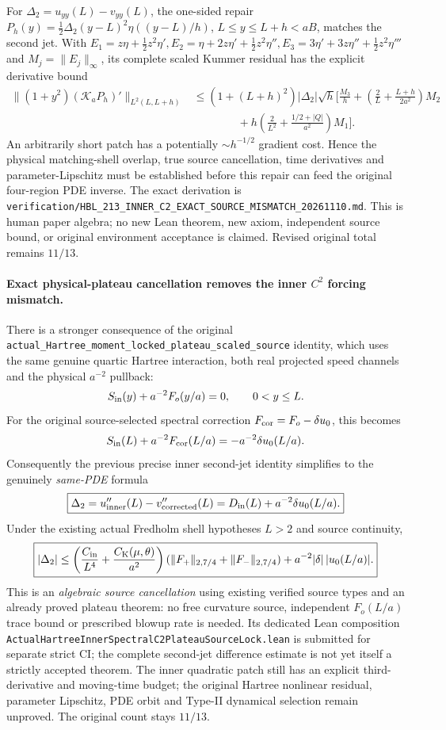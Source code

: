 \documentclass[11pt]{amsart}
\begin{document}
For \(\Delta_2=u_{yy}(L)-v_{yy}(L)\),
the one-sided repair
\(P_h(y)=\tfrac12\Delta_2(y-L)^2
\eta((y-L)/h)\), \(L\le y\le L+h<aB\),
matches the second jet. With
\(
 E_1=z\eta+\frac12z^2\eta',
 E_2=\eta+2z\eta'+\frac12z^2\eta'',
 E_3=3\eta'+3z\eta''+\frac12z^2\eta'''
\)
and \(M_j=\|E_j\|_\infty\), its
complete scaled Kummer residual has the explicit derivative bound
\[
\begin{split}
 \|(1+y^2)(\mathcal K_aP_h)'\|_{L^2(L,L+h)}
 &\le(1+(L+h)^2)|\Delta_2|\sqrt h
 \bigg[
 \frac{M_3}{h}+
 \left(\frac2L+\frac{L+h}{2a^2}\right)M_2\\
 &\qquad\qquad
 +h\left(\frac2{L^2}+
   \frac{1/2+|Q|}{a^2}\right)M_1
 \bigg].
\end{split}
\]
An arbitrarily short patch has a potentially \(\sim h^{-1/2}\)
gradient cost. Hence the physical matching-shell overlap, true
source cancellation, time derivatives and parameter-Lipschitz
must be established before this repair can feed the original
four-region PDE inverse. The exact derivation is
\texttt{verification/HBL\_213\_INNER\_C2\_EXACT\_SOURCE\_MISMATCH\_20261110.md}.
This is human paper algebra; no new Lean theorem,
new axiom, independent source bound, or original environment
acceptance is claimed. Revised original total remains \(11/13\).


\paragraph{Exact physical-plateau cancellation removes the inner \(C^2\) forcing mismatch.}
There is a stronger consequence of the original
\texttt{actual\_Hartree\_moment\_locked\_plateau\_scaled\_source}
identity, which uses the same genuine quartic Hartree
interaction, both real projected speed channels and the
physical \(a^{-2}\) pullback:
\[
 S_{\rm in}(y)+a^{-2}F_o(y/a)=0,\qquad0<y\le L.
\]
For the original source-selected spectral correction
\(F_{\rm cor}=F_o-\delta u_0\), this becomes
\[
 S_{\rm in}(L)+a^{-2}F_{\rm cor}(L/a)
 =-a^{-2}\delta u_0(L/a).
\]
Consequently the previous precise inner second-jet
identity simplifies to the genuinely \emph{same-PDE}
formula
\[
 \boxed{
 \Delta_2=u_{\rm inner}''(L)-v_{\rm corrected}''(L)
  =D_{\rm in}(L)+a^{-2}\delta u_0(L/a).
 }
\]
Under the existing actual Fredholm shell hypotheses
\(L>2\) and source continuity,
\[
 \boxed{
 |\Delta_2|
 \le\left(\frac{C_{\rm in}}{L^4}
  +\frac{C_{\rm K}(\mu,\theta)}{a^2}\right)
   (\|F_+\|_{2,7/4}+\|F_-\|_{2,7/4})
  +a^{-2}|\delta|\,|u_0(L/a)|.
 }
\]
This is an \emph{algebraic source cancellation}
using existing verified source types and an already
proved plateau theorem: no free curvature source,
independent \(F_o(L/a)\) trace bound or prescribed
blowup rate is needed. Its dedicated Lean composition
\texttt{ActualHartreeInnerSpectralC2PlateauSourceLock.lean}
is submitted for separate strict CI; the complete
second-jet difference estimate is not yet itself a
strictly accepted theorem. The inner quadratic patch
still has an explicit third-derivative and moving-time
budget; the original Hartree nonlinear residual,
parameter Lipschitz, PDE orbit and Type-II dynamical
selection remain unproved. The original count stays
\(11/13\).
\end{document}
